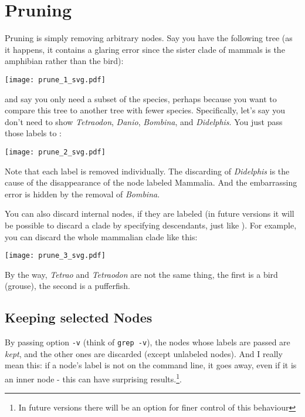 \section{Pruning}
\label{sct_prune}

Pruning is simply removing arbitrary nodes. Say you have the following tree (as
it happens, it contains a glaring error since the sister clade of mammals is the
amphibian rather than the bird):

\begin{center}
\texttt{[image: prune\_1\_svg.pdf]}
\end{center}

\noindent{}and say you only need a subset of the species, perhaps because you
want to compare this tree to another tree with fewer species. Specifically,
let's say you don't need to show \textit{Tetraodon}, \textit{Danio},
\textit{Bombina}, and \textit{Didelphis}. You just pass those labels to
\prune:


\begin{center}
\texttt{[image: prune\_2\_svg.pdf]}
\end{center}

\noindent{}Note that each label is removed individually. The discarding of
\textit{Didelphis} is the cause of the disappearance of the node labeled
Mammalia. And the embarrassing error is hidden by the removal of
\textit{Bombina}.

You can also discard internal nodes, if they are labeled (in future versions
it will be possible to discard a clade by specifying descendants, just like
\clade). For example, you can discard the whole mammalian clade like this:


\begin{center}
\texttt{[image: prune\_3\_svg.pdf]} 
\end{center}

By the way, \textit{Tetrao} and \textit{Tetraodon} are not the same thing, the
first is a bird (grouse), the second is a pufferfish.

\subsection{Keeping selected Nodes}

By passing option \texttt{-v} (think of \texttt{grep -v}), the nodes whose
labels are passed are \emph{kept}, and the other ones are discarded (except
unlabeled nodes). And I really mean this: if a node's label is not on the
command line, it goes away, even if it is an inner node - this can have
surprising results.\footnote{In future versions there will be an option for
finer control of this behaviour}.

